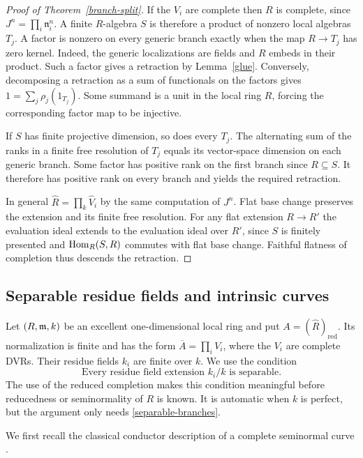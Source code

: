 \begin{proof}[Proof of Theorem~\ref{branch-split}]
If the $V_i$ are complete then $R$ is complete, since $J^n=\prod_i\mathfrak n_i^n$. A finite $R$-algebra $S$ is therefore a product of nonzero local algebras $T_j$. A factor is nonzero on every generic branch exactly when the map $R\to T_j$ has zero kernel. Indeed, the generic localizations are fields and $R$ embeds in their product. Such a factor gives a retraction by Lemma~\ref{glue}. Conversely, decomposing a retraction as a sum of functionals on the factors gives $1=\sum_j\rho_j(1_{T_j})$. Some summand is a unit in the local ring $R$, forcing the corresponding factor map to be injective.

If $S$ has finite projective dimension, so does every $T_j$. The alternating sum of the ranks in a finite free resolution of $T_j$ equals its vector-space dimension on each generic branch. Some factor has positive rank on the first branch since $R\subseteq S$. It therefore has positive rank on every branch and yields the required retraction.

In general $\widehat R=\prod_k\widehat V_i$ by the same computation of $J^n$. Flat base change preserves the extension and its finite free resolution. For any flat extension $R\to R'$ the evaluation ideal extends to the evaluation ideal over $R'$, since $S$ is finitely presented and $\operatorname{Hom}_R(S,R)$ commutes with flat base change. Faithful flatness of completion thus descends the retraction.
\end{proof}

\subsection{Separable residue fields and intrinsic curves}

Let $(R,\mathfrak m,k)$ be an excellent one-dimensional local ring and put
$A=(\widehat R)_{\mathrm{red}}$.  Its normalization is finite and has
the form $\overline A=\prod_iV_i$, where the $V_i$ are complete DVRs.
Their residue fields $k_i$ are finite over $k$.  We use the condition
\[
 \tag{SB}\label{separable-branches}
 \text{Every residue field extension }k_i/k\text{ is separable.}
\]
The use of the reduced completion makes this condition meaningful
before reducedness or seminormality of $R$ is known.  It is automatic
when $k$ is perfect, but the argument only needs
\eqref{separable-branches}.

We first recall the classical conductor description of a complete
seminormal curve \cite{Swan,EH}.

